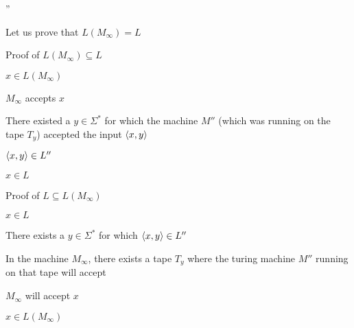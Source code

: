 ''


Let us prove that $L(M_\infty) = L$

Proof of $L(M_\infty) \subseteq L$

$x \in L(M_\infty)$

\imp
$M_\infty$ accepts $x$

\imp
There existed a $y \in \Sigma^*$ for which the machine $M''$ (which was running on the tape $T_y$) accepted the input $\langle x, y \rangle$

\imp
$\langle x, y \rangle \in L''$

\imp
$x \in L$


Proof of $L \subseteq L(M_\infty)$

$x \in L$

\imp
There exists a $y \in \Sigma^*$ for which $\langle x, y \rangle \in L''$

\imp
In the machine $M_\infty$, there exists a tape $T_y$ where the turing machine $M''$ running on that tape will accept

\imp
$M_\infty$ will accept $x$

\imp
$x \in L(M_\infty)$
















